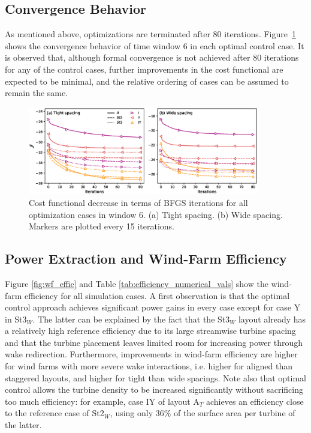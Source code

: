 \documentclass[a4paper]{jpconf}
\begin{document}
\subsection{Convergence Behavior}

As mentioned above, optimizations are terminated after 80 iterations. Figure~\ref{fig:convergence} shows the convergence behavior of time window 6 in each optimal control case. It is observed that, although formal convergence is not achieved after 80 iterations for any of the control cases, further improvements in the cost functional are expected to be minimal, and the relative ordering of cases can be assumed to remain the same.

\begin{figure}
	\centering
	\includegraphics[width=0.9\textwidth]{Torque18/convergence.eps}
	\caption{Cost functional decrease in terms of BFGS iterations for all optimization cases in window 6. (a) Tight spacing. (b) Wide spacing. Markers are plotted every 15 iterations.\label{fig:convergence} }
\end{figure}

\subsection{Power Extraction and Wind-Farm Efficiency}

Figure \ref{fig:wf_effic} and Table \ref{tab:efficiency_numerical_vals} show the wind-farm efficiency for all simulation cases. A first observation is that the optimal control approach achieves significant power gains in every case except for case Y in St3$_W$. The latter can be explained by the fact that the St3$_W$ layout already has a relatively high reference efficiency due to its large streamwise turbine spacing and that the turbine placement leaves limited room for increasing power through wake redirection. Furthermore, improvements in wind-farm efficiency are higher for wind farms with more severe wake interactions, i.e. higher for aligned than staggered layouts, and higher for tight than wide spacings. Note also that optimal control allows the turbine density to be increased significantly without sacrificing too much efficiency: for example, case IY of layout A$_T$ achieves an efficiency close to the reference case of St2$_W$, using only 36$\%$ of the surface area per turbine of the latter. 
\end{document}
